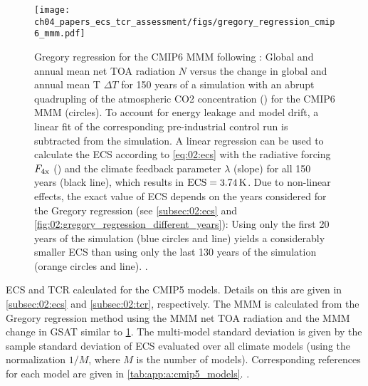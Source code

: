 \begin{figure}[t]
  \centering
  \texttt{[image: 
    ch04\_papers\_ecs\_tcr\_assessment/figs/gregory\_regression\_cmip6\_mmm.pdf]}
  \caption[
    Gregory regression for the \acs{CMIP}6 \acl{MMM}.
  ]{
    Gregory regression for the \acs{CMIP}6 \acf{MMM} following
    \textcite{Gregory2004}: Global and annual mean net \acl{TOA} radiation $N$
    versus the change in global and annual mean \acl{T} $\Delta T$ for 150
    years of a simulation with an abrupt quadrupling of the atmospheric
    \acs{CO2} concentration () for the \acs{CMIP}6 \acs{MMM}
    (circles). To account for energy leakage and model drift, a linear fit of
    the corresponding pre-industrial control run is subtracted from the
     simulation. A linear regression can be used to calculate the
    \acf{ECS} according to \cref{eq:02:ecs} with the radiative forcing
    $F_\mathtxt{4x}$ (\yintercept) and the climate feedback parameter $\lambda$
    (slope) for all 150 years (black line), which results in $\mathtxt{ECS} =
    3.74 \unit{K}$. Due to non-linear effects, the exact value of \acs{ECS}
    depends on the years considered for the Gregory regression (see
    \cref{subsec:02:ecs} and \cref{fig:02:gregory_regression_different_years}):
    Using only the first 20 years of the simulation (blue circles and line)
    yields a considerably smaller \acs{ECS} than using only the last 130 years
    of the simulation (orange circles and line). .
  }
  \label{fig:04:gregory_regression_cmip6_mmm}
\end{figure}

\begin{table}[!t]
  \centering
  \caption[
    \Acf{ECS} and \acf{TCR} calculated for the \acs{CMIP}5 models.
  ]{
    \Acf{ECS} and \acf{TCR} calculated for the \acs{CMIP}5 models. Details on
    this are given in \cref{subsec:02:ecs} and \cref{subsec:02:tcr},
    respectively. The \acf{MMM} is calculated from the Gregory regression
    method using the \acs{MMM} net \acf{TOA} radiation and the \acs{MMM} change
    in \acf{GSAT} similar to \cref{fig:04:gregory_regression_cmip6_mmm}. The
    multi-model standard deviation is given by the sample standard deviation of
    \acs{ECS} evaluated over all climate models (using the normalization $1 /
    M$, where $M$ is the number of models). Corresponding references for each
    model are given in \cref{tab:app:a:cmip5_models}. .
  }
  \label{tab:04:ecs_tcr_cmip5}
\end{table}

